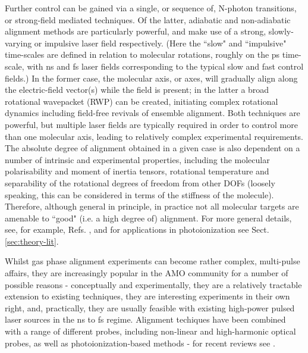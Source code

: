 \documentclass[10pt]{article}
\begin{document}
Further control can be gained via a single, or sequence of, N-photon transitions, or strong-field mediated techniques. Of the latter, adiabatic and non-adiabatic alignment methods are particularly powerful, and make use of a strong, slowly-varying or impulsive laser field respectively. (Here the ``slow" and ``impulsive" time-scales are defined in relation to molecular rotations, roughly on the ps time-scale, with ns and fs laser fields corresponding to the typical slow and fast control fields.) In the former case, the molecular axis, or axes, will gradually align along the electric-field vector(s) while the field is present; in the latter a broad rotational wavepacket (RWP) can be created, initiating complex rotational dynamics including field-free revivals of ensemble alignment. Both techniques are powerful, but multiple laser fields are typically required in order to control more than one molecular axis, leading to relatively complex experimental requirements. The absolute degree of alignment obtained in a given case is also dependent on a number of intrinsic and experimental properties, including the molecular polarisability 
and moment of inertia tensors, rotational temperature and separability of the rotational degrees of freedom from other DOFs (loosely speaking, this can be considered in terms of the stiffness of the molecule). Therefore, although general in principle, in practice not all molecular targets are amenable to ``good" (i.e. a high degree of) alignment. For more general details, see, for example, Refs. \cite{ koch2019QuantumControlMolecular, Stapelfeldt2003}, and for applications in photoionization see Sect. \ref{sec:theory-lit}.

Whilst gas phase alignment experiments can become rather complex, multi-pulse affairs, they are increasingly popular in the AMO community for a number of possible reasons - conceptually and experimentally, they are a relatively tractable extension to existing techniques, they are interesting experiments in their own right, and, practically, they are usually feasible with existing high-power pulsed laser sources in the ns to fs regime. Alignment techiques have been combined with a range of different probes, including non-linear and high-harmonic optical probes, as well as photoionization-based methods - for recent reviews see \cite{hasegawa2015NonadiabaticMolecularAlignment,koch2019QuantumControlMolecular}. 
\end{document}
